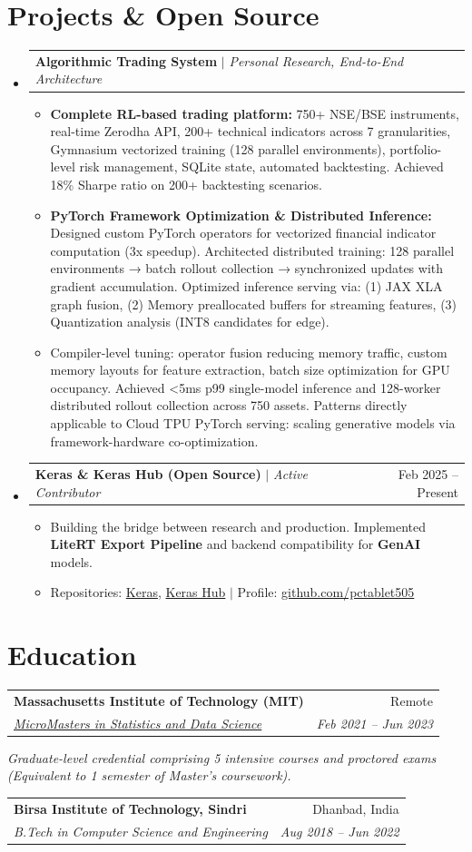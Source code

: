 \documentclass[10pt, letterpaper]{article}
\makeatletter
\newcommand{\resumeItem}[1]{
  \item\small{
    {#1 \vspace{-2pt}}
  }
}
\newcommand{\resumeSubheading}[4]{
  \vspace{-1pt}\item
    \begin{tabular*}{0.98\textwidth}[t]{l@{\extracolsep{\fill}}r}
      \textbf{#1} & {\small\color{darkgray} #2} \\
      \textit{\small#3} & \textit{\small\color{darkgray} #4} \\
    \end{tabular*}\vspace{-7pt}
}
\newcommand{\resumeProjectHeading}[2]{
    \item
    \begin{tabular*}{0.98\textwidth}{l@{\extracolsep{\fill}}r}
      \small#1 & #2 \\
    \end{tabular*}\vspace{-7pt}
}
\newcommand{\resumeSubHeadingListStart}{\begin{itemize}[leftmargin=0.15in, label={}]}
\newcommand{\resumeSubHeadingListEnd}{\end{itemize}}
\newcommand{\resumeItemListStart}{\begin{itemize}}
\newcommand{\resumeItemListEnd}{\end{itemize}\vspace{-5pt}}
\makeatother
\begin{document}
\section{Projects \& Open Source}
  \resumeSubHeadingListStart
    \resumeProjectHeading
      {\textbf{Algorithmic Trading System} $|$ \emph{Personal Research, End-to-End Architecture}}{}
      \resumeItemListStart
        \resumeItem{\textbf{Complete RL-based trading platform:} 750+ NSE/BSE instruments, real-time Zerodha API, 200+ technical indicators across 7 granularities, Gymnasium vectorized training (128 parallel environments), portfolio-level risk management, SQLite state, automated backtesting. Achieved 18\% Sharpe ratio on 200+ backtesting scenarios.}
        \resumeItem{\textbf{PyTorch Framework Optimization \& Distributed Inference:} Designed custom PyTorch operators for vectorized financial indicator computation (3x speedup). Architected distributed training: 128 parallel environments → batch rollout collection → synchronized updates with gradient accumulation. Optimized inference serving via: (1) JAX XLA graph fusion, (2) Memory preallocated buffers for streaming features, (3) Quantization analysis (INT8 candidates for edge).}
        \resumeItem{Compiler-level tuning: operator fusion reducing memory traffic, custom memory layouts for feature extraction, batch size optimization for GPU occupancy. Achieved <5ms p99 single-model inference and 128-worker distributed rollout collection across 750 assets. Patterns directly applicable to Cloud TPU PyTorch serving: scaling generative models via framework-hardware co-optimization.}
      \resumeItemListEnd

    \resumeProjectHeading
      {\textbf{Keras \& Keras Hub (Open Source)} $|$ \emph{Active Contributor}}{Feb 2025 -- Present}
      \resumeItemListStart
        \resumeItem{Building the bridge between research and production. Implemented \textbf{LiteRT Export Pipeline} and backend compatibility for \textbf{GenAI} models.}
        \resumeItem{Repositories: \href{https://github.com/keras-team/keras}{Keras}, \href{https://github.com/keras-team/keras-hub}{Keras Hub} $|$ Profile: \href{https://github.com/pctablet505}{\color{midnightblue}github.com/pctablet505}}
      \resumeItemListEnd
      
  \resumeSubHeadingListEnd

\section{Education}
  \resumeSubHeadingListStart
    \resumeSubheading
      {Massachusetts Institute of Technology (MIT)}{Remote}
      {\href{https://micromasters.mit.edu/ds}{MicroMasters in Statistics and Data Science}}{Feb 2021 -- Jun 2023}
      \vspace{-4pt}
      \small{\item{\textit{Graduate-level credential comprising 5 intensive courses and proctored exams (Equivalent to 1 semester of Master's coursework).}}}
    \resumeSubheading
      {Birsa Institute of Technology, Sindri}{Dhanbad, India}
      {B.Tech in Computer Science and Engineering}{Aug 2018 -- Jun 2022}
  \resumeSubHeadingListEnd
\end{document}
